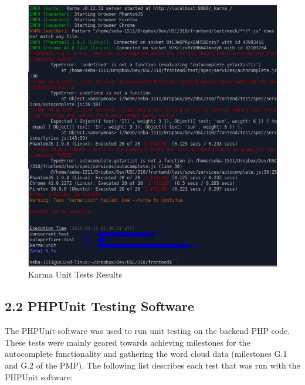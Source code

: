 \documentclass[]{article}
\begin{document}
\begin{figure}[htbp]
\centering
\includegraphics{karma.png}
\caption{Karma Unit Tests Results}
\end{figure}

\subsection{2.2 PHPUnit Testing
Software}\label{phpunit-testing-software}

The PHPUnit software was used to run unit testing on the backend PHP
code. These tests were mainly geared towards achieving milestones for
the autocomplete functionality and gathering the word cloud data
(milestones G.1 and G.2 of the PMP). The following list describes each
test that was run with the PHPUnit software:
\end{document}
